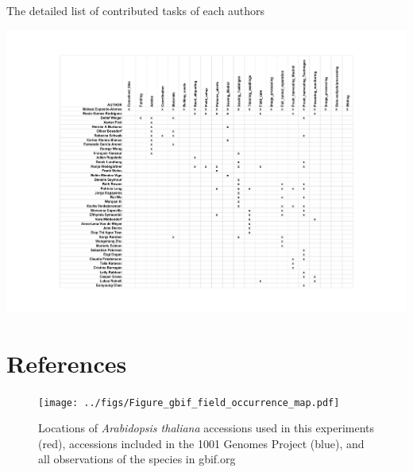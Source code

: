 \documentclass[12pt,]{article}
\begin{document}
The detailed list of contributed tasks of each authors

\centerline{\includegraphics[width=7in]{../figs/People_paper.pdf}}

\section{References}\label{references}



\pagebreak

\begin{figure}
    \centerline{\texttt{[image: ../figs/Figure\_gbif\_field\_occurrence\_map.pdf]}}
    \caption{ Locations of \textit{Arabidopsis thaliana} accessions used in this experiments (red), accessions included in the 1001 Genomes Project (blue), and all observations of the species in gbif.org}
    \label{fig:ecotypes}
\end{figure}
\end{document}

